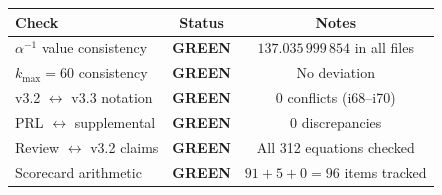 \documentclass[11pt,a4paper]{article}
\newcommand{\GREEN}{\textcolor{dfdgreen}{\textbf{GREEN}}}
\begin{document}
\begin{center}
\begin{tabular}{lcc}
\toprule
\textbf{Check} & \textbf{Status} & \textbf{Notes} \\
\midrule
$\alpha^{-1}$ value consistency & \GREEN & $137.035\,999\,854$ in all files \\
$k_{\max} = 60$ consistency & \GREEN & No deviation \\
v3.2 $\leftrightarrow$ v3.3 notation & \GREEN & 0 conflicts (i68--i70) \\
PRL $\leftrightarrow$ supplemental & \GREEN & 0 discrepancies \\
Review $\leftrightarrow$ v3.2 claims & \GREEN & All 312 equations checked \\
Scorecard arithmetic & \GREEN & $91 + 5 + 0 = 96$ items tracked \\
\bottomrule
\end{tabular}
\end{center}
\end{document}

